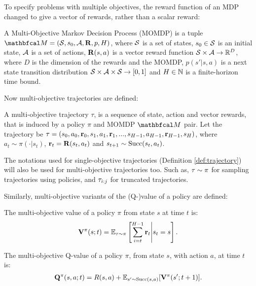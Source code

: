     To specify problems with multiple objectives, the reward function of an MDP changed to give a vector of rewards, rather than a scalar reward:
    \begin{defn}
        \label{def:mo_mdp}
        A \textnormal{Multi-Objective Markov Decision Process} (MOMDP) is a tuple $\bfcl{M}=(\cl{S},s_0,\cl{A},\bff{R},p,H)$, where $\mathcal{S}$ is a set of states, $s_0\in\mathcal{S}$ is an initial state, $\mathcal{A}$ is a set of actions, $\mathbf{R}(s,a)$ is a vector reward function $\mathcal{S}\times \mathcal{A}\rightarrow \mathbb{R}^D$, where $D$ is the dimension of the rewards and the MOMDP, $p(s' | s,a)$ is a next state transition distribution $\mathcal{S} \times \mathcal{A} \times \mathcal{S} \rightarrow [0,1]$ and $H\in\mathbb{N}$ is a finite-horizon time bound.
    \end{defn}

    Now multi-objective trajectories are defined:
    \begin{defn}
        \label{def:mo_trajectory}
        A \textnormal{multi-objective trajectory} $\tau$, is a sequence of state, action and vector rewards, that is induced by a policy $\pi$ and MOMDP $\bfcl{M}$ pair. Let the trajectory be $\mathbf{\tau} = (s_0, a_0, \mathbf{r}_0, s_1, a_1, \mathbf{r}_1, ..., s_{H-1}, a_{H-1}, \mathbf{r}_{H-1}, s_H)$, where $a_t \sim \pi(\cdot|s_t)$, $\mathbf{r}_t=\mathbf{R}(s_t,a_t)$ and $s_{t+1} \sim {\textnormal{Succ}(s_t,a_t)}$. 
        
        The notations used for single-objective trajectories (Definition \ref{def:trajectory}) will also be used for multi-objective trajectories too. Such as, $\mathbf{\tau}\sim\pi$ for sampling trajectories using policies, and $\mathbf{\tau}_{i:j}$ for truncated trajectories.
    \end{defn}

    Similarly, multi-objective variants of the (Q-)value of a policy are defined:    
    \begin{defn}
        \label{def:mo_value}
        \label{def:mo_q_value}
        The \textnormal{multi-objective value} of a policy $\pi$ from state $s$ at time $t$ is:
        \begin{align}
            \mathbf{V}^{\pi}(s;t) = \mathbb{E}_{\mathbf{\tau}\sim\pi}\left[\sum_{i=t}^{H-1} \mathbf{r}_t \Bigg| s_t=s \right].
        \end{align} 

        The \textnormal{multi-objective Q-value} of a policy $\pi$, from state $s$, with action $a$, at time $t$ is:
        \begin{align}
            \mathbf{Q}^{\pi}(s,a;t) = R(s,a) + \mathbb{E}_{s'\sim {\textnormal{Succ}(s,a)}} [\mathbf{V}^{\pi}(s';t+1)].
        \end{align} 
    \end{defn}

